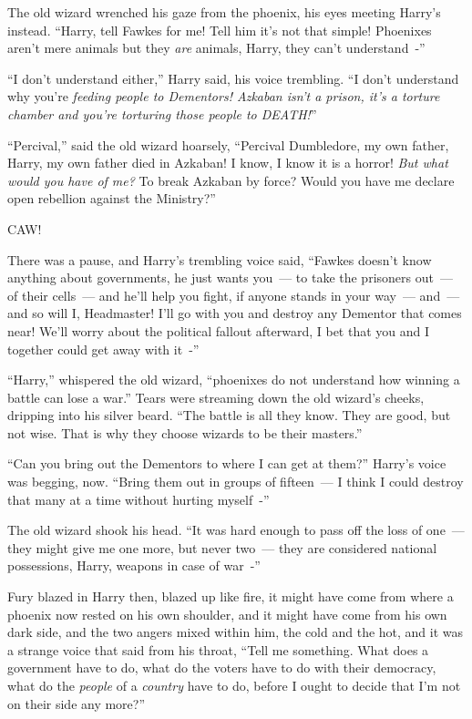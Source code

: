 The old wizard wrenched his gaze from the phoenix, his eyes meeting Harry's instead. ``Harry, tell Fawkes for me! Tell him it's not that simple! Phoenixes aren't mere animals but they \emph{are} animals, Harry, they can't understand~-''

``I don't understand either,'' Harry said, his voice trembling. ``I don't understand why you're \emph{feeding people to Dementors! Azkaban isn't a prison, it's a torture chamber and you're torturing those people to DEATH!}''

``Percival,'' said the old wizard hoarsely, ``Percival Dumbledore, my own father, Harry, my own father died in Azkaban! I know, I know it is a horror! \emph{But what would you have of me?} To break Azkaban by force? Would you have me declare open rebellion against the Ministry?''

CAW!

There was a pause, and Harry's trembling voice said, ``Fawkes doesn't know anything about governments, he just wants you~--- to take the prisoners out~--- of their cells~--- and he'll help you fight, if anyone stands in your way~--- and~--- and so will I, Headmaster! I'll go with you and destroy any Dementor that comes near! We'll worry about the political fallout afterward, I bet that you and I together could get away with it~-''

``Harry,'' whispered the old wizard, ``phoenixes do not understand how winning a battle can lose a war.'' Tears were streaming down the old wizard's cheeks, dripping into his silver beard. ``The battle is all they know. They are good, but not wise. That is why they choose wizards to be their masters.''

``Can you bring out the Dementors to where I can get at them?'' Harry's voice was begging, now. ``Bring them out in groups of fifteen~--- I think I could destroy that many at a time without hurting myself~-''

The old wizard shook his head. ``It was hard enough to pass off the loss of one~--- they might give me one more, but never two~--- they are considered national possessions, Harry, weapons in case of war~-''

Fury blazed in Harry then, blazed up like fire, it might have come from where a phoenix now rested on his own shoulder, and it might have come from his own dark side, and the two angers mixed within him, the cold and the hot, and it was a strange voice that said from his throat, ``Tell me something. What does a government have to do, what do the voters have to do with their democracy, what do the \emph{people} of a \emph{country} have to do, before I ought to decide that I'm not on their side any more?''

